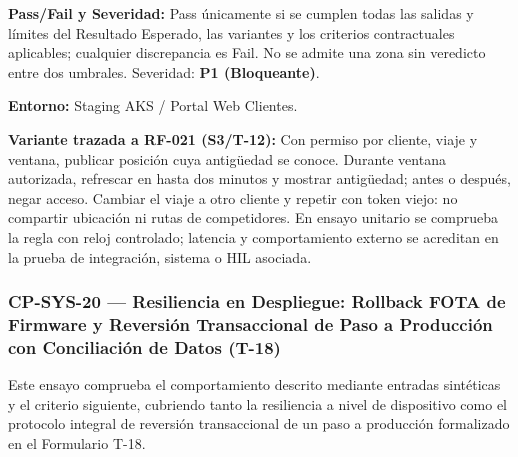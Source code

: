 \par\noindent\textbf{Pass/Fail y Severidad:} Pass únicamente si se cumplen todas las salidas y límites del Resultado Esperado, las variantes y los criterios contractuales aplicables; cualquier discrepancia es Fail. No se admite una zona sin veredicto entre dos umbrales. Severidad: \textbf{P1 (Bloqueante)}.\par
\par\noindent\textbf{Entorno:} Staging AKS / Portal Web Clientes.\par







\par\noindent\textbf{Variante trazada a RF-021 (S3/T-12):} Con permiso por cliente, viaje y ventana, publicar posición cuya antigüedad se conoce. Durante ventana autorizada, refrescar en hasta dos minutos y mostrar antigüedad; antes o después, negar acceso. Cambiar el viaje a otro cliente y repetir con token viejo: no compartir ubicación ni rutas de competidores. En ensayo unitario se comprueba la regla con reloj controlado; latencia y comportamiento externo se acreditan en la prueba de integración, sistema o HIL asociada.\par
\subsubsection*{CP-SYS-20 — Resiliencia en Despliegue: Rollback FOTA de Firmware y Reversión Transaccional de Paso a Producción con Conciliación de Datos (T-18)}\label{sec:9-cp-sys-20}
Este ensayo comprueba el comportamiento descrito mediante entradas sintéticas y el criterio siguiente, cubriendo tanto la resiliencia a nivel de dispositivo como el protocolo integral de reversión transaccional de un paso a producción formalizado en el Formulario T-18.

